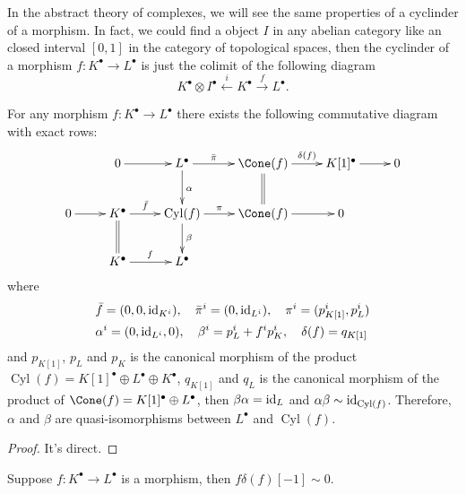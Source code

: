 In the abstract theory of complexes, we will see the same properties of a cyclinder of a morphism.
In fact, we could find a object $I$ in any abelian category like an closed interval $[0,1]$ in the 
category of topological spaces, then the cyclinder of a morphism $f:K^\bullet \to L^\bullet$ 
is just the colimit of the following diagram 
\[
	K^\bullet\otimes I^\bullet \xleftarrow{i}K^\bullet \xrightarrow{f}L^\bullet.
\]

\begin{pro}\label{pro:1.12}
	For any morphism $f:K^\bullet \to L^\bullet$ there exists the following commutative
	diagram with exact rows:
	\begin{equation}\label{tri}
		\xymatrix{
			& 0\ar[r] & L^\bullet \ar[r]^-{\bar\pi}\ar[d]^\alpha & \Cone(f) \ar[r]^-{\delta(f)}\ar@{=}[d]
			& K[1]^\bullet \ar[r] & 0\\
			0 \ar[r] & K^\bullet \ar[r]^-{\bar f}\ar@{=}[d] & \operatorname{Cyl}(f) \ar[r]^-\pi\ar[d]^\beta 
			&\Cone(f) \ar[r] & 0 & \\
			& K^\bullet \ar[r]^f & L^\bullet & & &
		}
	\end{equation}
	where
	\[
		\begin{aligned}
		&\bar f = (0,0,\operatorname{id}_{K^i}),\quad\bar\pi^i=(0,\operatorname{id}_{L^i}),\quad \pi^i=(p^i_{K[1]},p^i_{L})\\
		&\alpha^i = (0,\operatorname{id}_{L^i},0),\quad \beta^i= p^i_{L} + f^i p^i_K,\quad \delta(f)=q_{K[1]}
		\end{aligned}
	\]
	and $p_{K[1]}$, $p_{L}$ and $p_{K}$ is the canonical morphism of the product 
	$\operatorname{Cyl}(f)=K[1]^\bullet\oplus L^\bullet\oplus K^\bullet$,
	$q_{K[1]}$ and $q_L$ is the canonical morphism of the product of $\Cone(f)=K[1]^\bullet\oplus L^\bullet$,
	then $\beta\alpha=\operatorname{id}_L$ and $\alpha\beta\sim \operatorname{id}_{\operatorname{Cyl}(f)}$.
	Therefore, $\alpha$ and $\beta$ are quasi-isomorphisms between $L^\bullet$ and $\operatorname{Cyl}(f)$.
\end{pro}

\begin{proof}
	It's direct.
\end{proof}

\begin{lem}\label{lem:1.13}
	Suppose $f:K^\bullet\to L^\bullet$ is a morphism, then $f\delta(f)[-1]\sim 0$.
\end{lem}

